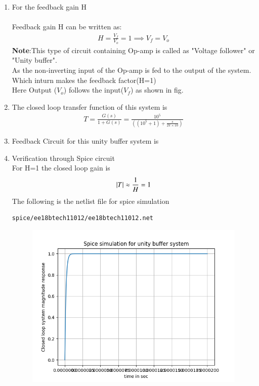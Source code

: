 \begin{enumerate}[label=\thesubsection.\arabic*.,ref=\thesubsection.\theenumi]
%
\item For the feedback gain H\\
\solution\\
Feedback gain H can be written as:
\begin{align}
         H = \frac{V_{f}}{V_{o}} = 1
\implies V_{f} = V_{o}
\end{align}
\textbf{Note}:This type of circuit containing Op-amp is called as "Voltage follower" or "Unity buffer".\\
As the non-inverting input of the Op-amp is fed to the output of the system.\\
Which inturn makes the feedback factor(H=1)\\
Here Output ($V_{o}$) follows the input($V_{f}$) as shown in fig.
\item The closed loop transfer function of this system is
\begin{align}
    T = \frac{G(s)}{1+G(s)} = \frac{10^5}{((10^5+1)+\frac{s}{2\pi\times10})}
\end{align}
\item Feedback Circuit for this unity buffer system is
\\
\solution
\begin{figure}[ht!]
	\begin{center}
		\resizebox{\columnwidth}{!}{}
	\end{center}
	\caption{}
	\label{fig:ee18btech11012_fig2}
\end{figure}
\item Verification through Spice circuit
\\
\solution For H=1 the closed loop gain is
\begin{align}
    \left\vert T\right\vert \approx \frac{1}{H} = 1
\end{align}
The following is the netlist file for spice simulation
\begin{lstlisting}
spice/ee18btech11012/ee18btech11012.net
\end{lstlisting}
\begin{figure}[!h]
\centering
\includegraphics[width=\columnwidth]{./figs/ee18btech11012_1/ee18btech11012_spiceresult.eps}

\end{figure}
\end{enumerate}
